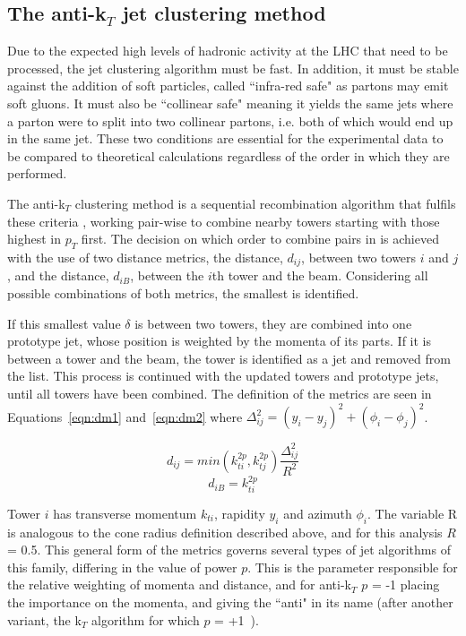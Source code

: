 \subsection{The anti-k$_{T}$ jet clustering method}

Due to the expected high levels of hadronic activity at the LHC that need to be processed, the jet clustering algorithm must be fast. In addition, it must be stable against the addition of soft particles, called ``infra-red safe" as partons may emit soft gluons. It must also be ``collinear safe" meaning it yields the same jets where a parton were to split into two collinear partons, i.e. both of which would end up in the same jet. These two conditions are essential for the experimental data to be compared to theoretical calculations regardless of the order in which they are performed.

The anti-k$_{T}$ clustering method \cite{akt} is a sequential recombination algorithm that fulfils these criteria \cite{aktrecom}, working pair-wise to combine nearby towers starting with those highest in $p_{T}$  first. The decision on which order to combine pairs in is achieved with the use of two distance metrics, the distance, $d_{ij}$, between two towers $i$ and $j$, and the distance, $d_{iB}$, between the $i$th tower and the beam. Considering all possible combinations of both metrics, the smallest is identified. 

If this smallest value $\delta$ is between two towers, they are combined into one prototype jet, whose position is weighted by the momenta of its parts. If it is between a tower and the beam, the tower is identified as a jet and removed from the list. This process is continued with the updated towers and prototype jets, until all towers have been combined. The definition of the metrics are seen in Equations~\ref{eqn:dm1} and~\ref{eqn:dm2} where $\Delta_{ij}^{2} = (y_{i}-y_{j})^{2} + (\phi_{i}-\phi_{j})^{2}$. 

 \begin{equation}
d_{ij} = min(k_{ti}^{2p},k_{tj}^{2p})\frac{\Delta_{ij}^{2}}{R^{2}}
\label{eqn:dm1}
\end{equation}
\begin{equation}
d_{iB} = k_{ti}^{2p}
\label{eqn:dm2}
\end{equation}

Tower $i$ has transverse momentum $k_{ti}$, rapidity $y_{i}$ and azimuth $\phi_{i}$. The variable R is analogous to the cone radius definition described above, and for this analysis $R$ = 0.5. This general form of the metrics governs several types of jet algorithms of this family, differing in the value of power $p$. This is the parameter responsible for the relative weighting of momenta and distance, and for anti-k$_{T}$ $p$ = -1 placing the importance on the momenta, and giving the ``anti" in its name (after another variant, the k$_{T}$ algorithm for which $p$ = +1~\cite{kt}).

